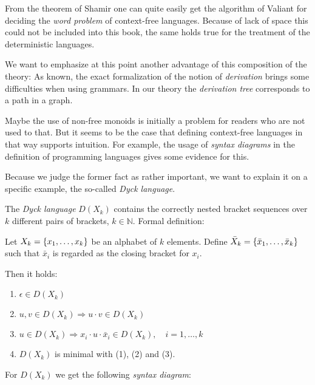 From the theorem of Shamir one can quite easily get the algorithm of Valiant
for deciding the {\em word problem} of context-free languages. Because of lack
of space this could not be included into this book, the same holds true for the
treatment of the deterministic languages.

We want to emphasize at this point another advantage of this composition of the
theory: As known, the exact formalization of the notion of {\em derivation} 
brings some difficulties when using grammars. In our theory the {\em derivation
tree} corresponds to a path in a graph.

Maybe the use of non-free monoids is initially a problem for readers who are not
used to that. But it seems to be the case that defining context-free
languages in that way supports intuition. For example, the usage of
{\em syntax diagrams} in the definition of programming languages gives some
evidence for this.

Because we judge the former fact as rather important, we want to explain it on a
specific example, the so-called {\em Dyck language}.


The {\em Dyck language} $D(X_k)$ contains the correctly nested bracket sequences
over $k$ different pairs of brackets, $k \in \mathbb{N}$. Formal definition:

Let $X_k = \mbox{$\{x_1, \ldots, x_k\}$}$ be an alphabet of $k$ elements. Define
$\bar{X}_k = \mbox{$\{\bar{x}_1, \ldots, \bar{x}_k\}$}$ such that $\bar{x}_i$ is
regarded as the closing bracket for $x_i$.

Then it holds:
\begin{enumerate}
  \item $\epsilon \in D(X_k)$
  \item $u, v \in D(X_k) \Rightarrow u \cdot v \in D(X_k)$
  \item $u \in D(X_k) \Rightarrow x_i \cdot u \cdot \bar{x}_i \in D(X_k),\quad i
  = 1, \ldots, k$
  \item $D(X_k)$ is minimal with (1), (2) and (3). 
\end{enumerate}

For $D(X_k)$ we get the following {\em syntax diagram}:

\begin{center}

\end{center}

